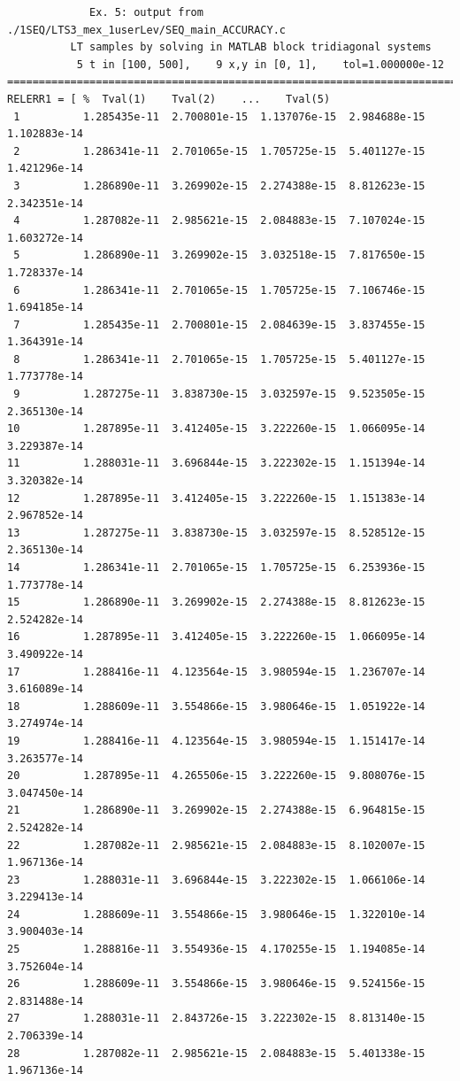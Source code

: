 \documentclass[a4paper,10pt]{report}%
\begin{document}
\begin{lstlisting}
             Ex. 5: output from ./1SEQ/LTS3_mex_1userLev/SEQ_main_ACCURACY.c
          LT samples by solving in MATLAB block tridiagonal systems
           5 t in [100, 500],    9 x,y in [0, 1],    tol=1.000000e-12
====================================================================================
RELERR1 = [ %  Tval(1)    Tval(2)    ...    Tval(5)
 1          1.285435e-11  2.700801e-15  1.137076e-15  2.984688e-15  1.102883e-14
 2          1.286341e-11  2.701065e-15  1.705725e-15  5.401127e-15  1.421296e-14
 3          1.286890e-11  3.269902e-15  2.274388e-15  8.812623e-15  2.342351e-14
 4          1.287082e-11  2.985621e-15  2.084883e-15  7.107024e-15  1.603272e-14
 5          1.286890e-11  3.269902e-15  3.032518e-15  7.817650e-15  1.728337e-14
 6          1.286341e-11  2.701065e-15  1.705725e-15  7.106746e-15  1.694185e-14
 7          1.285435e-11  2.700801e-15  2.084639e-15  3.837455e-15  1.364391e-14
 8          1.286341e-11  2.701065e-15  1.705725e-15  5.401127e-15  1.773778e-14
 9          1.287275e-11  3.838730e-15  3.032597e-15  9.523505e-15  2.365130e-14
10          1.287895e-11  3.412405e-15  3.222260e-15  1.066095e-14  3.229387e-14
11          1.288031e-11  3.696844e-15  3.222302e-15  1.151394e-14  3.320382e-14
12          1.287895e-11  3.412405e-15  3.222260e-15  1.151383e-14  2.967852e-14
13          1.287275e-11  3.838730e-15  3.032597e-15  8.528512e-15  2.365130e-14
14          1.286341e-11  2.701065e-15  1.705725e-15  6.253936e-15  1.773778e-14
15          1.286890e-11  3.269902e-15  2.274388e-15  8.812623e-15  2.524282e-14
16          1.287895e-11  3.412405e-15  3.222260e-15  1.066095e-14  3.490922e-14
17          1.288416e-11  4.123564e-15  3.980594e-15  1.236707e-14  3.616089e-14
18          1.288609e-11  3.554866e-15  3.980646e-15  1.051922e-14  3.274974e-14
19          1.288416e-11  4.123564e-15  3.980594e-15  1.151417e-14  3.263577e-14
20          1.287895e-11  4.265506e-15  3.222260e-15  9.808076e-15  3.047450e-14
21          1.286890e-11  3.269902e-15  2.274388e-15  6.964815e-15  2.524282e-14
22          1.287082e-11  2.985621e-15  2.084883e-15  8.102007e-15  1.967136e-14
23          1.288031e-11  3.696844e-15  3.222302e-15  1.066106e-14  3.229413e-14
24          1.288609e-11  3.554866e-15  3.980646e-15  1.322010e-14  3.900403e-14
25          1.288816e-11  3.554936e-15  4.170255e-15  1.194085e-14  3.752604e-14
26          1.288609e-11  3.554866e-15  3.980646e-15  9.524156e-15  2.831488e-14
27          1.288031e-11  2.843726e-15  3.222302e-15  8.813140e-15  2.706339e-14
28          1.287082e-11  2.985621e-15  2.084883e-15  5.401338e-15  1.967136e-14

\end{lstlisting}
\end{document}
